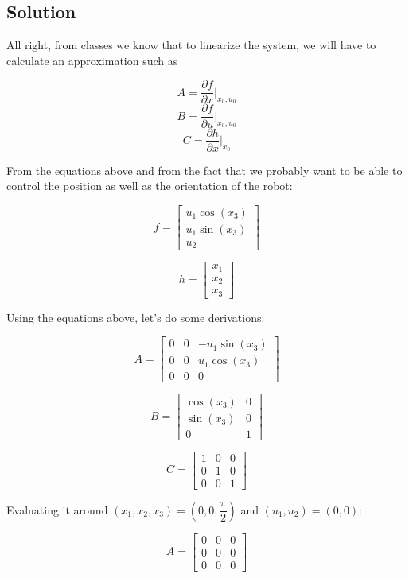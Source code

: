 \documentclass[10pt,a4paper]{article}
\begin{document}
\subsection*{Solution}
All right, from classes we know that to linearize the system, we will have to calculate an approximation such as

\[ A = \dfrac{\partial f}{\partial x} \Big |_{x_{0}, u_{0}} \]
\[ B = \dfrac{\partial f}{\partial u} \Big |_{x_{0}, u_{0}} \]
\[ C = \dfrac{\partial h}{\partial x} \Big |_{x_{0}} \]

From the equations above and from the fact that we probably want to be able to control the position as well as the orientation of the robot:

\[ f = 
\begin{bmatrix}
u_{1}\cos(x_{3}) \\
u_{1}\sin(x_{3}) \\
u_{2}
\end{bmatrix}
\]

\[ h = 
\begin{bmatrix}
x_{1}  \\
x_{2}  \\
x_{3}
\end{bmatrix}
\]

Using the equations above, let's do some derivations:

\[ A = 
\begin{bmatrix}
0 & 0 & -u_{1}\sin(x_{3}) \\
0 & 0 & u_{1}\cos(x_{3}) \\
0 & 0 & 0
\end{bmatrix}
\]

\[ B = 
\begin{bmatrix}
\cos(x_{3}) & 0 \\
\sin(x_{3}) & 0 \\
0 & 1
\end{bmatrix}
\]

\[ C =
\begin{bmatrix}
1 & 0 & 0 \\
0 & 1 & 0 \\
0 & 0 & 1
\end{bmatrix}
\]

Evaluating it around $(x_{1}, x_{2}, x_{3}) = (0,0, \dfrac{\pi}{2})$ and $(u_{1},u_{2}) = (0,0)$:

\[ A = 
\begin{bmatrix}
0 & 0 & 0 \\
0 & 0 & 0 \\
0 & 0 & 0
\end{bmatrix}
\]
\end{document}
